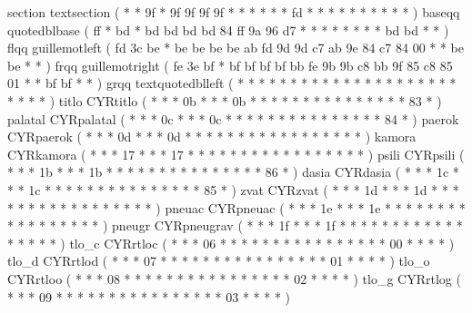 \makechr section      textsection       ( *  *       9f *   9f 9f 9f 9f    *  *  *  *  *     *  fd *  *     *  *  *     *   *  *    *  *   )%
\makechr baseqq       quotedblbase      ( ff *       bd *   bd bd bd bd    84 ff 9a 96 d7    *  *  *  *     *  *  *     *   bd bd   *  *   )%
\makechr flqq         guillemotleft     ( fd 3c      be *   be be be be    ab fd 9d 9d c7    ab 9e 84 c7    84 00 *     *   be be   *  *   )%
\makechr frqq         guillemotright    ( fe 3e      bf *   bf bf bf bf    bb fe 9b 9b c8    bb 9f 85 c8    85 01 *     *   bf bf   *  *   )%
\makechr grqq         textquotedblleft  ( *  *       *  *   *  *  *  *     *  *  *  *  *     *  *  *  *     *  *  *     *   *  *    *  *   )%
%
\makechr titlo        CYRtitlo          ( *  *       *  0b  *  *  *  0b    *  *  *  *  *     *  *  *  *     *  *  *     *   *  *    83 *   )
\makechr palatal      CYRpalatal        ( *  *       *  0c  *  *  *  0c    *  *  *  *  *     *  *  *  *     *  *  *     *   *  *    84 *   )
\makechr paerok       CYRpaerok         ( *  *       *  0d  *  *  *  0d    *  *  *  *  *     *  *  *  *     *  *  *     *   *  *    *  *   )
%
\makechr kamora       CYRkamora         ( *  *       *  17  *  *  *  17    *  *  *  *  *     *  *  *  *     *  *  *     *   *  *    *  *   )
\makechr psili        CYRpsili          ( *  *       *  1b  *  *  *  1b    *  *  *  *  *     *  *  *  *     *  *  *     *   *  *    86 *   )
\makechr dasia        CYRdasia          ( *  *       *  1c  *  *  *  1c    *  *  *  *  *     *  *  *  *     *  *  *     *   *  *    85 *   )
\makechr zvat         CYRzvat           ( *  *       *  1d  *  *  *  1d    *  *  *  *  *     *  *  *  *     *  *  *     *   *  *    *  *   )
\makechr pneuac       CYRpneuac         ( *  *       *  1e  *  *  *  1e    *  *  *  *  *     *  *  *  *     *  *  *     *   *  *    *  *   )
\makechr pneugr       CYRpneugrav       ( *  *       *  1f  *  *  *  1f    *  *  *  *  *     *  *  *  *     *  *  *     *   *  *    *  *   )
%
\makechr tlo_c        CYRrtloc          ( *  *       *  06  *  *  *  *     *  *  *  *  *     *  *  *  *     *  *  *     00  *  *    *  *   )
\makechr tlo_d        CYRrtlod          ( *  *       *  07  *  *  *  *     *  *  *  *  *     *  *  *  *     *  *  *     01  *  *    *  *   )
\makechr tlo_o        CYRrtloo          ( *  *       *  08  *  *  *  *     *  *  *  *  *     *  *  *  *     *  *  *     02  *  *    *  *   )
\makechr tlo_g        CYRrtlog          ( *  *       *  09  *  *  *  *     *  *  *  *  *     *  *  *  *     *  *  *     03  *  *    *  *   )
